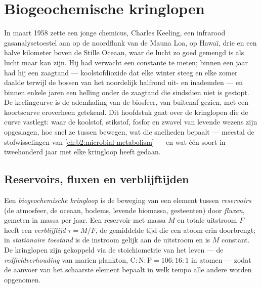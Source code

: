 \chapter{Biogeochemische kringlopen}\label{ch:b2:biogeochemical-cycles}

In maart 1958 zette een jonge chemicus, Charles Keeling, een infrarood
gasanalysetoestel aan op de noordflank van de Mauna Loa, op Hawaï, drie en een
halve kilometer boven de Stille Oceaan, waar de lucht zo goed gemengd is als
lucht maar kan zijn. Hij had verwacht een constante te meten; binnen een jaar
had hij een zaagtand --- koolstofdioxide dat elke winter steeg en elke zomer
daalde terwijl de bossen van het noordelijk halfrond uit- en inademden --- en
binnen enkele jaren een helling onder de zaagtand die sindsdien niet is
gestopt. De keelingcurve is de ademhaling van de biosfeer, van buitenaf
gezien, met een koortscurve eroverheen getekend. Dit hoofdstuk gaat over de
kringlopen die de curve vastlegt: waar de koolstof, stikstof, fosfor en
zwavel van levende wezens zijn opgeslagen, hoe snel ze tussen 
bewegen, wat die snelheden bepaalt --- meestal de stofwisselingen van
\cref{ch:b2:microbial-metabolism} --- en wat één soort in tweehonderd jaar met
elke kringloop heeft gedaan.

\section{Reservoirs, fluxen en verblijftijden}

\begin{definition}\label{def:b2:biogeochemical-cycles:reservoir}
Een \emph{biogeochemische kringloop} is de beweging van een element tussen
\emph{reservoirs} (de atmosfeer, de oceaan, bodems, levende biomassa,
gesteenten) door \emph{fluxen}, gemeten in massa per jaar. Een reservoir met
massa $M$ en totale uitstroom $F$ heeft een \emph{verblijftijd}
$\tau = M/F$, de gemiddelde tijd die een atoom erin doorbrengt; in
\emph{stationaire toestand} is de instroom gelijk aan de uitstroom en is $M$
constant. De kringlopen zijn gekoppeld via de stoichiometrie van het leven ---
de \emph{redfieldverhouding} van marien plankton, $\mathrm{C:N:P} =
106:16:1$ in atomen --- zodat de aanvoer van het schaarste element
bepaalt in welk tempo alle andere worden opgenomen.
\end{definition}

